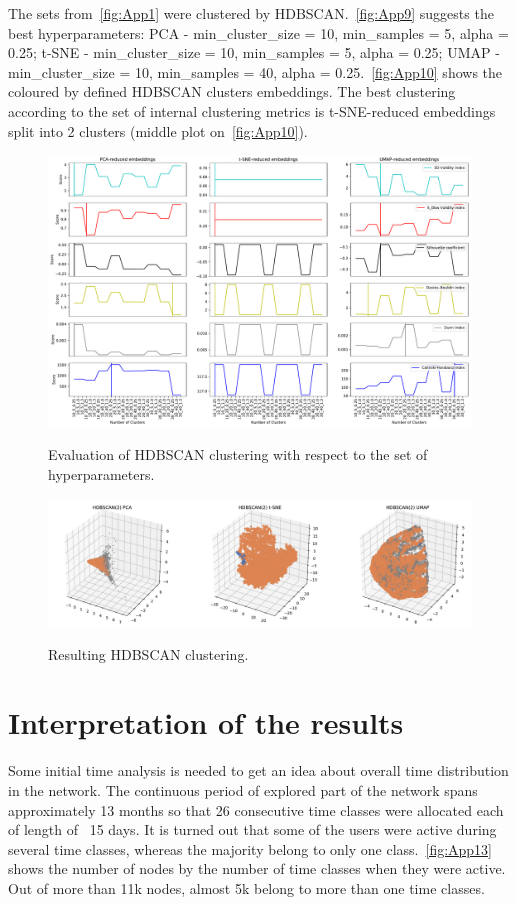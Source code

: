 The sets from~\autoref{fig:App1} were clustered by HDBSCAN.~\autoref{fig:App9} suggests the best hyperparameters: PCA - min\_cluster\_size = 10, min\_samples = 5, alpha = 0.25;
t-SNE - min\_cluster\_size = 10, min\_samples = 5, alpha = 0.25; UMAP - min\_cluster\_size = 10, min\_samples = 40, alpha = 0.25.~\autoref{fig:App10} shows the coloured by defined HDBSCAN clusters embeddings. The best clustering according to the set of internal clustering metrics is t-SNE-reduced embeddings split into 2 clusters (middle plot on~\autoref{fig:App10}).

\begin{figure}[!ht]
	\centering
	\includegraphics[width=1.0\textwidth]{images/appendix/App9.pdf}\\
	\caption{Evaluation of HDBSCAN clustering with respect to the set of hyperparameters.}
	\label{fig:App9}
\end{figure}
\begin{figure}[!ht]
	\centering
	\includegraphics[width=1.0\textwidth]{images/appendix/App10.pdf}\\
	\caption{Resulting HDBSCAN clustering.}
	\label{fig:App10}
\end{figure}

\section{Interpretation of the results}
Some initial time analysis is needed to get an idea about overall time distribution in the network. The continuous period of explored part of the network spans approximately 13 months so that 26 consecutive time classes were allocated each of length of ~15 days. It is turned out that some of the users were active during several time classes, whereas the majority belong to only one class.~\autoref{fig:App13} shows the number of nodes by the number of time classes when they were active. Out of more than 11k nodes, almost 5k belong to more than one time classes.

